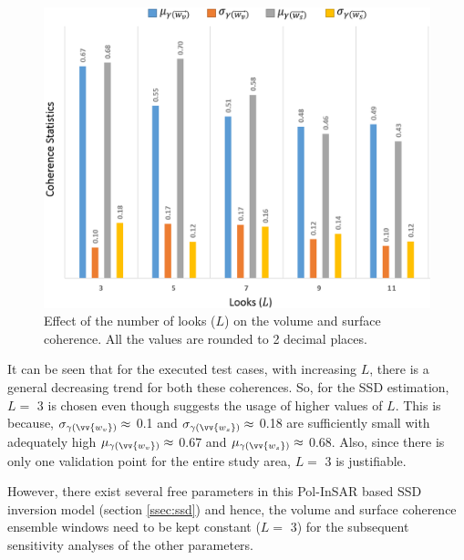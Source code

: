 \documentclass[12pt]{elsarticle}
\numberwithin{equation}{section}
\numberwithin{figure}{section}
\numberwithin{table}{section}
\begin{document}
\begin{figure}[htb]
    \centering
    \includegraphics[width=\textwidth]{Figures/Results/Coh_SSD.png}
    \caption{Effect of the number of looks ($L$) on the volume and surface coherence. All the values are rounded to 2
decimal places.}
    \label{fig:ssd_coh}
\end{figure}

It can be seen that for the executed test cases, with increasing $L$, there is a general decreasing trend for both these coherences. So, for the SSD estimation, $L =$ 3 is chosen even though \cite{Cloude2005} suggests the usage of higher values of $L$. This is because, $\sigma_{\gamma\left(\vv{w_v}\right)} \approx$ 0.1 and $\sigma_{\gamma\left(\vv{w_s}\right)} \approx$ 0.18 are sufficiently small with adequately high $\mu_{\gamma\left(\vv{w_v}\right)} \approx$ 0.67 and $\mu_{\gamma\left(\vv{w_s}\right)} \approx$ 0.68. Also, since there is only one validation point for the entire study area, $L =$ 3 is justifiable.

However, there exist several free parameters in this Pol-InSAR based SSD inversion model (section \ref{ssec:ssd}) and hence, the volume and surface coherence ensemble windows need to be kept constant ($L =$ 3) for the subsequent sensitivity analyses of the other parameters.
\end{document}
